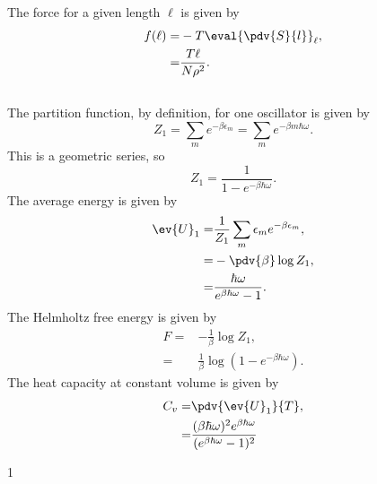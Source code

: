 \documentclass[a4paper,12pt,twoside]{article}
\newcommand{\mcols}{0}
\begin{document}
\begin{multicols*}{2}
\subsubsection{}
The force for a given length $\ell$ is given by
\begin{align}
	f(\ell) =& -T\eval{\pdv{S}{l}}_\ell,\\
	=& \frac{T\ell}{N\rho^2}.
\end{align}

\subsection{}
\subsubsection{}
The partition function, by definition, for one oscillator is given by
\begin{equation}
	Z_1 = \sum_m e^{-\beta \epsilon_m} = \sum_m e^{-\beta m\hbar \omega}.
\end{equation}
This is a geometric series, so
\begin{equation}
	Z_1 = \frac{1}{1-e^{-\beta \hbar \omega}}.
\end{equation}
The average energy is given by
\begin{align}
	\ev{U}_1 =& \frac{1}{Z_1} \sum_m \epsilon_m e^{-\beta \epsilon_m},\\
	=& -\pdv{\beta} \log Z_1,\\
	=& \frac{\hbar\omega}{e^{\beta\hbar\omega}-1}.
\end{align}
The Helmholtz free energy is given by
\begin{align}
	F =& - \frac{1}{\beta}\log Z_1,\\
	=& \frac{1}{\beta} \log(1-e^{-\beta\hbar\omega}).
\end{align}
The heat capacity at constant volume is given by
\begin{align}
	C_v =& \pdv{\ev{U}_1}{T},\\
	=& \frac{(\beta\hbar\omega)^2 e^{\beta\hbar\omega}}{(e^{\beta\hbar\omega}-1)^2}
\end{align}

\printBib


\if\mcols1
\end{multicols*}
\fi
\end{document}

